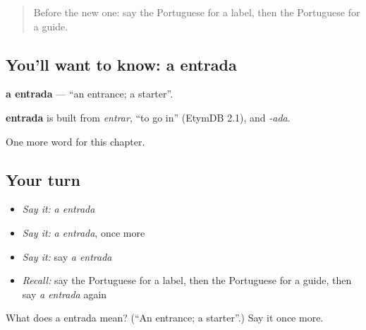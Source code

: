 \begin{quote}
Before the new one: say the Portuguese for a label, then the Portuguese for a guide.
\end{quote}

\subsection*{You'll want to know: a entrada}
\textbf{a entrada} — \textquotedblleft{}an entrance; a starter\textquotedblright{}.

\begin{cousinweb}
\textbf{entrada} is built from \emph{entrar}, \textquotedblleft{}to go in\textquotedblright{} (EtymDB 2.1), and \emph{-ada}.
\end{cousinweb}

\begin{grammarlens}[title={What you've built}]
One more word for this chapter.
\end{grammarlens}

\subsection*{Your turn}
\begin{itemize}
\raggedright
  \item \emph{Say it:} \emph{a entrada}
  \item \emph{Say it:} \emph{a entrada}, once more
  \item \emph{Say it:} say \emph{a entrada}
  \item \emph{Recall:} say the Portuguese for a label, then the Portuguese for a guide, then say \emph{a entrada} again
\end{itemize}

\begin{tcolorbox}[breakable,colback=teal!4,colframe=teal!35!black,title={Before you move on}]
What does a entrada mean? (\textquotedblleft{}An entrance; a starter\textquotedblright{}.) Say it once more.
\end{tcolorbox}
